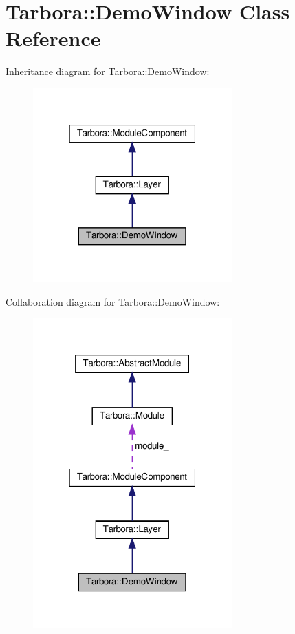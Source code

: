 \hypertarget{classTarbora_1_1DemoWindow}{}\section{Tarbora\+:\+:Demo\+Window Class Reference}
\label{classTarbora_1_1DemoWindow}


Inheritance diagram for Tarbora\+:\+:Demo\+Window\+:\nopagebreak
\begin{figure}[H]
\begin{center}
\leavevmode
\includegraphics[width=217pt]{classTarbora_1_1DemoWindow__inherit__graph}
\end{center}
\end{figure}


Collaboration diagram for Tarbora\+:\+:Demo\+Window\+:\nopagebreak
\begin{figure}[H]
\begin{center}
\leavevmode
\includegraphics[width=217pt]{classTarbora_1_1DemoWindow__coll__graph}
\end{center}
\end{figure}
